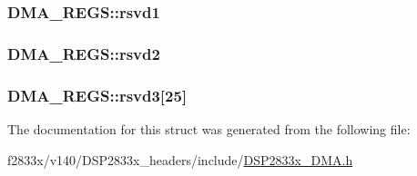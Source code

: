 \subsubsection[{rsvd1}]{ D\+M\+A\+\_\+\+R\+E\+G\+S\+::rsvd1}\label{struct_d_m_a___r_e_g_s_a6d1bb8f80e16e2e1ba7446ea44a39de6}
\hypertarget{struct_d_m_a___r_e_g_s_af11472d9ce8b6e37382b1dc5c0d28b22}{}
\subsubsection[{rsvd2}]{ D\+M\+A\+\_\+\+R\+E\+G\+S\+::rsvd2}\label{struct_d_m_a___r_e_g_s_af11472d9ce8b6e37382b1dc5c0d28b22}
\hypertarget{struct_d_m_a___r_e_g_s_a564f87c05e41d51e2d68aebf687e33c3}{}
\subsubsection[{rsvd3}]{ D\+M\+A\+\_\+\+R\+E\+G\+S\+::rsvd3\mbox{[}25\mbox{]}}\label{struct_d_m_a___r_e_g_s_a564f87c05e41d51e2d68aebf687e33c3}


The documentation for this struct was generated from the following file\+:\begin{DoxyCompactItemize}
\item 
f2833x/v140/\+D\+S\+P2833x\+\_\+headers/include/\hyperlink{_d_s_p2833x___d_m_a_8h}{D\+S\+P2833x\+\_\+\+D\+M\+A.\+h}\end{DoxyCompactItemize}
